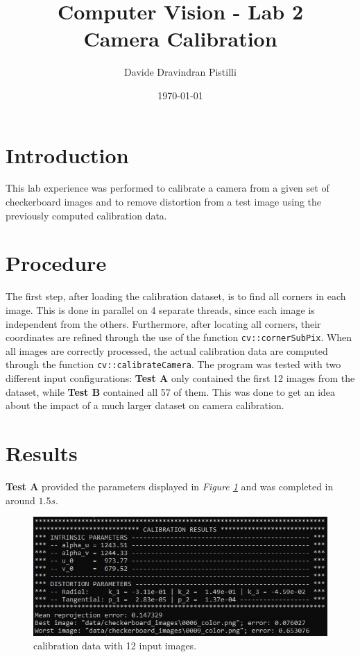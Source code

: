 \documentclass{article}
\title{Computer Vision - Lab 2 \\ Camera Calibration} %
\author{Davide Dravindran Pistilli} %
\date{\today} %
\begin{document}
\maketitle %

\section{Introduction}
This lab experience was performed to calibrate a camera from a given set of checkerboard images and to remove distortion from a test image using the previously computed calibration data.

\section{Procedure}
The first step, after loading the calibration dataset, is to find all corners in each image. This is done in parallel on 4 separate threads, since each image is independent from the others. Furthermore, after locating all corners, their coordinates are refined through the use of the function \texttt{cv::cornerSubPix}.
When all images are correctly processed, the actual calibration data are computed through the function \texttt{cv::calibrateCamera}.
The program was tested with two different input configurations: \textbf{Test A} only contained the first 12 images from the dataset, while \textbf{Test B} contained all 57 of them.
This was done to get an idea about the impact of a much larger dataset on camera calibration.

\section{Results}
\textbf{Test A} provided the parameters displayed in \textit{Figure \ref{img_data_12}} and was completed in around $1.5s$.

\begin{figure}[h]
\begin{center}
\includegraphics[width=1\textwidth]{images/data_12}
\caption{\footnotesize{calibration data with 12 input images.}}
\label{img_data_12}
\end{center}
\end{figure}
\end{document}
